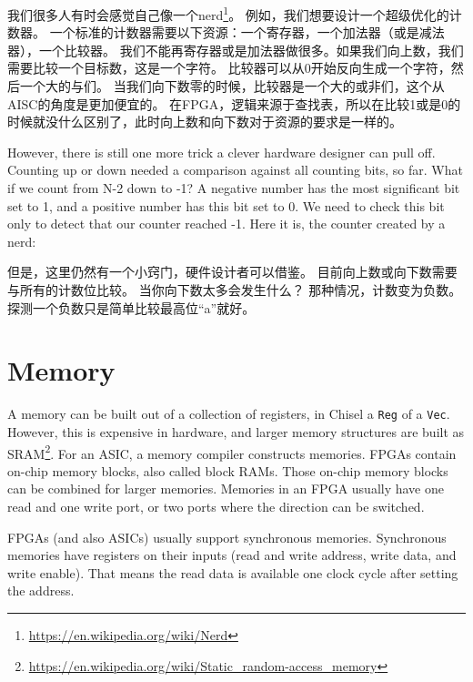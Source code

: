 \documentclass[%
    10pt,
    headinclude, footexclude,
    openright, %
    notitlepage,
    cleardoubleempty,
    headsepline,
    pointlessnumbers,
    bibtotoc, idxtotoc,
    ]{scrbook}
\newcommand{\code}[1]{{\small{\texttt{#1}}}}
\newcommand{\myref}[2]{\href{#1}{#2}}
\renewcommand{\myref}[2]{{#2}{\footnote{\url{#1}}}}
\begin{document}
我们很多人有时会感觉自己像一个\myref{https://en.wikipedia.org/wiki/Nerd}{nerd}。
例如，我们想要设计一个超级优化的计数器。
一个标准的计数器需要以下资源：一个寄存器，一个加法器（或是减法器），一个比较器。
我们不能再寄存器或是加法器做很多。如果我们向上数，我们需要比较一个目标数，这是一个字符。
比较器可以从0开始反向生成一个字符，然后一个大的与们。
当我们向下数零的时候，比较器是一个大的或非们，这个从AISC的角度是更加便宜的。
在FPGA，逻辑来源于查找表，所以在比较1或是0的时候就没什么区别了，此时向上数和向下数对于资源的要求是一样的。


However, there is still one more trick a clever hardware designer can pull off.
Counting up or down needed a comparison against all counting bits, so far.
What if we count from N-2 down to -1? A negative number has the most significant bit
set to 1, and a positive number has this bit set to 0. We need to check this bit only to detect
that our counter reached -1. Here it is, the counter created by a nerd:

但是，这里仍然有一个小窍门，硬件设计者可以借鉴。
目前向上数或向下数需要与所有的计数位比较。
当你向下数太多会发生什么？
那种情况，计数变为负数。探测一个负数只是简单比较最高位“a”就好。


\section{Memory}

A memory can be built out of a collection of registers, in Chisel a \code{Reg} of a \code{Vec}.
However, this is expensive in hardware, and larger memory structures are built
as \myref{https://en.wikipedia.org/wiki/Static_random-access_memory}{SRAM}.
For an ASIC, a memory compiler constructs memories.
FPGAs contain on-chip memory blocks, also called block RAMs.
Those on-chip memory blocks can be combined for larger memories.
Memories in an FPGA usually have one read and one write port, or
two ports where the direction can be switched.

FPGAs (and also ASICs) usually support synchronous memories.
Synchronous memories have registers on their inputs (read and write address, write data,
and write enable). That means the read data is available one clock
cycle after setting the address.
\end{document}
